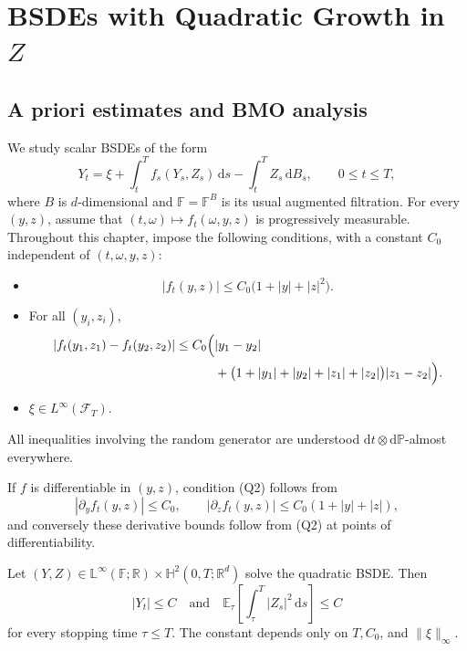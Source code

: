\chapter{BSDEs with Quadratic Growth in \texorpdfstring{$Z$}{Z}}

\section{A priori estimates and BMO analysis}

We study scalar BSDEs of the form
\[
  Y_t=\xi+\int_t^T f_s(Y_s,Z_s)\,\mathrm ds
      -\int_t^T Z_s\,\mathrm dB_s,
  \qquad 0\le t\le T,
\]
where $B$ is $d$-dimensional and $\mathbb F=\mathbb F^B$ is its usual
augmented filtration.  For every $(y,z)$, assume that
$(t,\omega)\mapsto f_t(\omega,y,z)$ is progressively measurable.
Throughout this chapter, impose the following conditions, with a constant
$C_0$ independent of $(t,\omega,y,z)$:
\begin{itemize}
  \item[(Q1)]
  \[
    |f_t(y,z)|\le C_0\bigl(1+|y|+|z|^2\bigr).
  \]
  \item[(Q2)] For all $(y_i,z_i)$,
  \[
  \begin{aligned}
    |f_t(y_1,z_1)-f_t(y_2,z_2)|
    \le C_0\Bigl(&|y_1-y_2|\\
      &+\bigl(1+|y_1|+|y_2|+|z_1|+|z_2|\bigr)|z_1-z_2|\Bigr).
  \end{aligned}
  \]
  \item[(Q3)] $\xi\in L^\infty(\mathcal F_T)$.
\end{itemize}
All inequalities involving the random generator are understood
$\mathrm dt\otimes\mathrm d\mathbb P$-almost everywhere.

\begin{remark}
If $f$ is differentiable in $(y,z)$, condition \textup{(Q2)} follows
from
\[
  |\partial_yf_t(y,z)|\le C_0,
  \qquad
  |\partial_zf_t(y,z)|\le C_0(1+|y|+|z|),
\]
and conversely these derivative bounds follow from \textup{(Q2)} at
points of differentiability.
\end{remark}

\begin{thm}
Let $(Y,Z)\in\mathbb L^\infty(\mathbb F;\mathbb R)
\times\mathbb H^2(0,T;\mathbb R^d)$ solve the quadratic BSDE\@.  Then
\[
  |Y_t|\le C
  \quad\text{and}\quad
  \mathbb E_\tau\!\left[\int_\tau^T|Z_s|^2\,\mathrm ds\right]\le C
\]
for every stopping time $\tau\le T$.  The constant depends only on
$T,C_0$, and $\|\xi\|_\infty$.
\end{thm}

